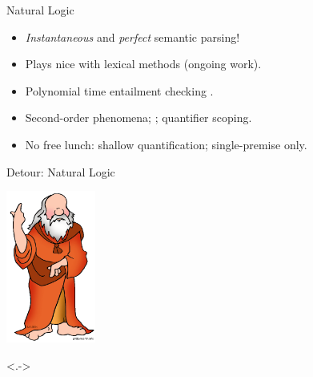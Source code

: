\begin{frame}{Natural Logic}
\begin{center}
\end{center}
\vspace{1em}
\pause

\begin{itemize}
\item \textit{Instantaneous} and \textit{perfect} semantic parsing!
\item Plays nice with lexical methods (ongoing work).
\end{itemize}
\vspace{1ex}
\pause

\begin{itemize}
\item Polynomial time entailment checking \cite{key:2008maccartney-natlog}.
\end{itemize}
\vspace{1ex}
\pause

\begin{itemize}
\item Second-order phenomena; ; quantifier scoping.
\pause
\item No free lunch: shallow quantification; single-premise only.
\end{itemize}
\end{frame}


\def\title{Detour: Natural Logic}
\begin{frame}{\title}
\begin{center}
  \includegraphics[height=5cm]{../img/aristotle.png}
\end{center}
\footnotetext<.->{\cite{key:1991valencia-natlog,key:2014icard-natlog}}
\end{frame}


